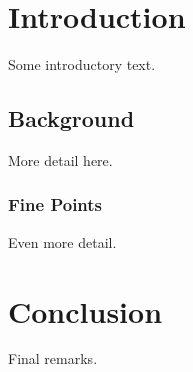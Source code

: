 \section{Introduction}
Some introductory text.

\subsection{Background}
More detail here.

\subsubsection{Fine Points}
Even more detail.

\section{Conclusion}
Final remarks.
